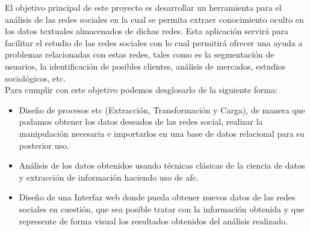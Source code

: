 \documentclass[../../main.tex]{subfiles}
\begin{document}
El objetivo principal de este proyecto es desarrollar un herramienta para el análisis de las redes sociales en la cual se permita extraer conocimiento oculto en los datos textuales almacenados de dichas redes. Esta aplicación servirá para facilitar el estudio de las redes sociales con lo cual permitirá ofrecer una ayuda a problemas relacionadas con estas redes, tales como es la segmentación de usuarios, la identificación de posibles clientes, análisis de mercados, estudios sociológicos, etc. \\

Para cumplir con este objetivo podemos desglosarlo de la siguiente forma:
\begin{itemize}
    \item Diseño de procesos \gls{etc} (Extracción, Transformación y Carga), de manera que podamos obtener los datos deseados de las redes social, realizar la manipulación necesaria e importarlos en una base de datos relacional para su posterior uso.
    \item Análisis de los datos obtenidos usando técnicas clásicas de la ciencia de datos y extracción de información haciendo uso de \Gls{afc}\cite{fca}. 
    \item Diseño de una Interfaz web donde pueda obtener nuevos datos de las redes sociales en cuestión, que sea posible tratar con la información obtenida y que represente de forma visual los resultados obtenidos del análisis realizado.
\end{itemize}
\end{document}
